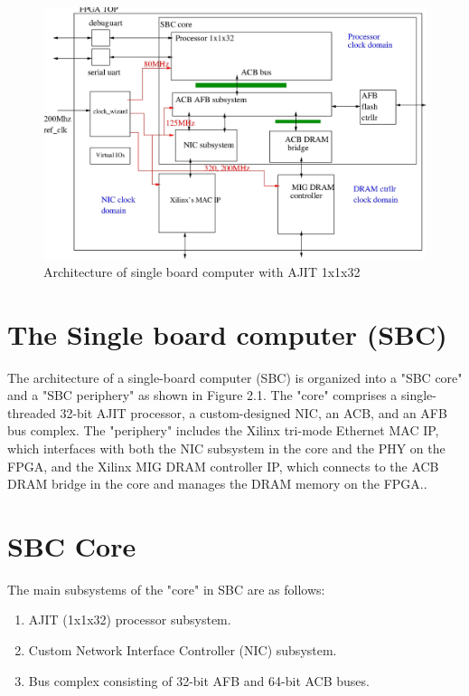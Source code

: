 \documentclass[12pt]{report}
\begin{document}
\begin{figure}[h]
			\centering
			\includegraphics[width=14cm]{../figures/FINAL_SBC.jpg}
			\caption{Architecture of single board computer with AJIT 1x1x32}
			\label{fig:NIC-Proc-top1}
		\end{figure}
\section{The Single board computer (SBC)}
The architecture of a single-board computer (SBC) is organized into a "SBC core" and a "SBC periphery" as shown in Figure 2.1. The "core" comprises a single-threaded 32-bit AJIT processor, a custom-designed NIC, an ACB, and an AFB bus complex. The "periphery" includes the Xilinx tri-mode Ethernet MAC IP, which interfaces with both the NIC subsystem in the core and the PHY on the FPGA, and the Xilinx MIG DRAM controller IP, which connects to the ACB DRAM bridge in the core and manages the DRAM memory on the FPGA..
\section{SBC Core}

The main subsystems of the "core" in SBC are as follows:
\begin{enumerate}
    \item AJIT (1x1x32) processor subsystem. 
    \item Custom Network Interface Controller (NIC) subsystem.
    \item Bus complex consisting of 32-bit AFB and 64-bit ACB buses.
\end{enumerate}
\end{document}
